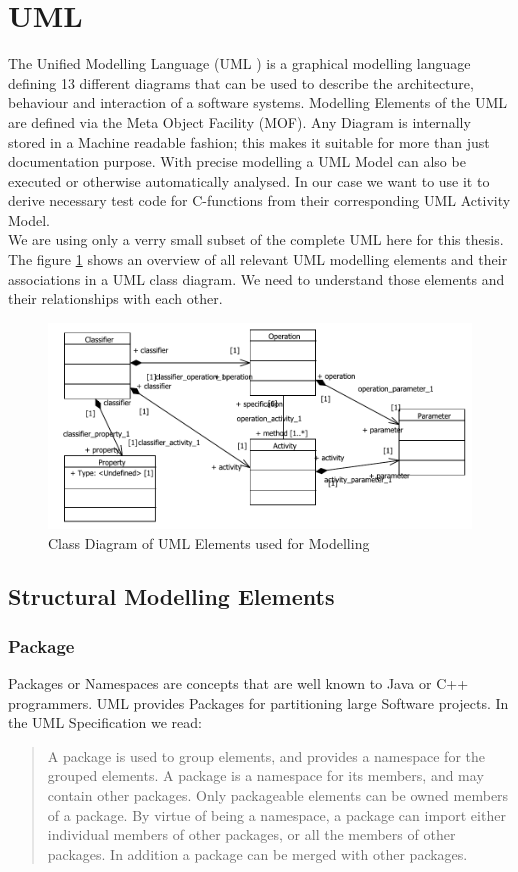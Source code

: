 \section{UML}
The Unified Modelling Language (UML \texttrademark ) is a graphical modelling language defining 13 different diagrams that can be used to describe the architecture, behaviour and interaction of a software systems. Modelling Elements of the UML are defined via the Meta Object Facility (MOF). Any Diagram is internally stored in a Machine readable fashion; this makes it suitable for more than just documentation purpose. With precise modelling a UML Model can also be executed or otherwise automatically analysed. In our case we want to use it to derive necessary test code for C-functions from their corresponding UML Activity Model. \\ We are using only a verry small subset of the complete UML here for this thesis. The figure \ref{relevantUMLClassDiagram} shows an overview of all relevant UML modelling elements and their associations in a UML class diagram. We need to understand those elements and their relationships with each other.
\begin{figure}\label{relevantUMLClassDiagram}
\includegraphics[width=\textwidth]{./pics/relevantUML.pdf}
\caption{Class Diagram of UML Elements used for Modelling}
\end{figure}
\subsection{Structural Modelling Elements}
\subsubsection{Package}
Packages or Namespaces are concepts that are well known to Java or C++ programmers. UML provides Packages for partitioning large Software projects. In the UML Specification we read:
\begin{quotation}
A package is used to group elements, and provides a namespace for the grouped elements.
A package is a namespace for its members, and may contain other packages. Only packageable elements can be owned
members of a package. By virtue of being a namespace, a package can import either individual members of other
packages, or all the members of other packages.
In addition a package can be merged with other packages.
\end{quotation}\cite{UML23Superstructure}
